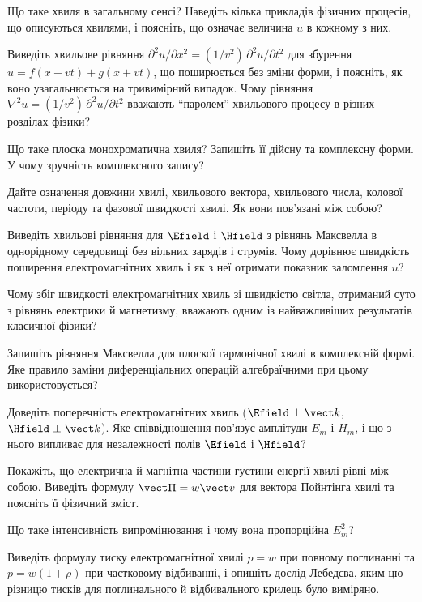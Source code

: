 \begin{Questions}
\begin{quizlist}
	\item Що таке хвиля в загальному сенсі? Наведіть кілька прикладів фізичних процесів, що описуються хвилями, і поясніть, що означає величина $u$ в кожному з них.
	\item Виведіть хвильове рівняння $\partial^2u/\partial x^2 = (1/v^2)\,\partial^2u/\partial t^2$ для збурення $u=f(x-vt)+g(x+vt)$, що поширюється без зміни форми, і поясніть, як воно узагальнюється на тривимірний випадок. Чому рівняння $\nabla^2u = (1/v^2)\,\partial^2u/\partial t^2$ вважають \enquote{паролем} хвильового процесу в різних розділах фізики?
	\item Що таке плоска монохроматична хвиля? Запишіть її дійсну та комплексну форми. У чому зручність комплексного запису?
	\item Дайте означення довжини хвилі, хвильового вектора, хвильового числа, колової частоти, періоду та фазової швидкості хвилі. Як вони пов'язані між собою?
	\item Виведіть хвильові рівняння для $\Efield$ і $\Hfield$ з рівнянь Максвелла в однорідному середовищі без вільних зарядів і струмів. Чому дорівнює швидкість поширення електромагнітних хвиль і як з неї отримати показник заломлення $n$?
	\item Чому збіг швидкості електромагнітних хвиль зі швидкістю світла, отриманий суто з рівнянь електрики й магнетизму, вважають одним із найважливіших результатів класичної фізики?
	\item Запишіть рівняння Максвелла для плоскої гармонічної хвилі в комплексній формі. Яке правило заміни диференціальних операцій алгебраїчними при цьому використовується?
	\item Доведіть поперечність електромагнітних хвиль ($\Efield\perp\vect k$, $\Hfield\perp\vect k$). Яке співвідношення пов'язує амплітуди $E_m$ і $H_m$, і що з нього випливає для незалежності полів $\Efield$ і $\Hfield$?
	\item Покажіть, що електрична й магнітна частини густини енергії хвилі рівні між собою. Виведіть формулу $\vect\Pi = w\vect v$ для вектора Пойнтінга хвилі та поясніть її фізичний зміст.
	\item Що таке інтенсивність випромінювання і чому вона пропорційна $E_m^2$?
	\item Виведіть формулу тиску електромагнітної хвилі $p=w$ при повному поглинанні та $p=w(1+\rho)$ при частковому відбиванні, і опишіть дослід Лебедєва, яким цю різницю тисків для поглинального й відбивального крилець було виміряно.

\end{quizlist}
\end{Questions}

